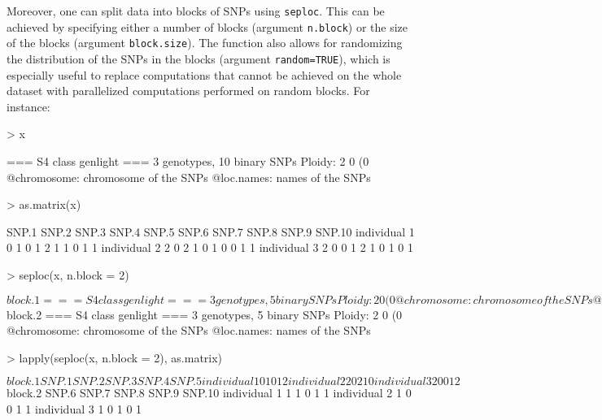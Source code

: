 \documentclass{article}
\begin{document}
Moreover, one can split data into blocks of SNPs using \texttt{seploc}.
This can be achieved by specifying either a number of blocks (argument \texttt{n.block}) or the size
of the blocks (argument \texttt{block.size}). The function also allows for randomizing the
distribution of the SNPs in the blocks (argument \texttt{random=TRUE}), which is especially useful
to replace computations that cannot be achieved on the whole dataset with parallelized computations performed on random blocks.
For instance:
\begin{Schunk}
\begin{Sinput}
> x
\end{Sinput}
\begin{Soutput}
 === S4 class genlight ===
 3 genotypes,  10 binary SNPs
 Ploidy: 2
 0 (0 %) missing data
 @chromosome: chromosome of the SNPs
 @loc.names: names of the SNPs
\end{Soutput}
\begin{Sinput}
> as.matrix(x)
\end{Sinput}
\begin{Soutput}
             SNP.1 SNP.2 SNP.3 SNP.4 SNP.5 SNP.6 SNP.7 SNP.8 SNP.9 SNP.10
individual 1     0     1     0     1     2     1     1     0     1      1
individual 2     2     0     2     1     0     1     0     0     1      1
individual 3     2     0     0     1     2     1     0     1     0      1
\end{Soutput}
\begin{Sinput}
> seploc(x, n.block = 2)
\end{Sinput}
\begin{Soutput}
$block.1
 === S4 class genlight ===
 3 genotypes,  5 binary SNPs
 Ploidy: 2
 0 (0 %) missing data
 @chromosome: chromosome of the SNPs
 @loc.names: names of the SNPs

$block.2
 === S4 class genlight ===
 3 genotypes,  5 binary SNPs
 Ploidy: 2
 0 (0 %) missing data
 @chromosome: chromosome of the SNPs
 @loc.names: names of the SNPs
\end{Soutput}
\begin{Sinput}
> lapply(seploc(x, n.block = 2), as.matrix)
\end{Sinput}
\begin{Soutput}
$block.1
             SNP.1 SNP.2 SNP.3 SNP.4 SNP.5
individual 1     0     1     0     1     2
individual 2     2     0     2     1     0
individual 3     2     0     0     1     2

$block.2
             SNP.6 SNP.7 SNP.8 SNP.9 SNP.10
individual 1     1     1     0     1      1
individual 2     1     0     0     1      1
individual 3     1     0     1     0      1
\end{Soutput}
\end{Schunk}
\end{document}

